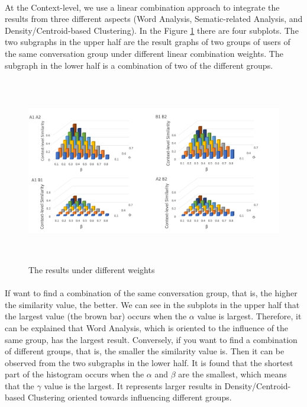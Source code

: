 \documentclass[a4paper,12pt]{report}
\begin{document}
\paragraph{}
At the Context-level, we use a linear combination approach to integrate the results from three different aspects (Word Analysis, Sematic-related Analysis, and Density/Centroid-based Clustering). In the Figure \ref{f:Result_Weight_Influence} there are four subplots. The two subgraphs in the upper half are the result graphs of two groups of users of the same conversation group under different linear combination weights. The subgraph in the lower half is a combination of two of the different groups.
\begin{figure}[btph]
\begin{center}
\includegraphics[width=6.464in,height=3.2in]{images and data/Result_Weight_Influence.png}
\caption{The results under different weights}
\label{f:Result_Weight_Influence}
\end{center}
\end{figure}

\paragraph{}
If want to find a combination of the same conversation group, that is, the higher the similarity value, the better. We can see in the subplots in the upper half that the largest value (the brown bar) occurs when the $\alpha$ value is largest. Therefore, it can be explained that Word Analysis, which is oriented to the influence of the same group, has the largest result. Conversely, if you want to find a combination of different groups, that is, the smaller the similarity value is. Then it can be observed from the two subgraphs in the lower half. It is found that the shortest part of the histogram occurs when the $\alpha$ and $\beta$ are the smallest, which means that the $\gamma$ value is the largest. It represents larger results in Density/Centroid-based Clustering oriented towards influencing different groups.
\clearpage
\end{document}
